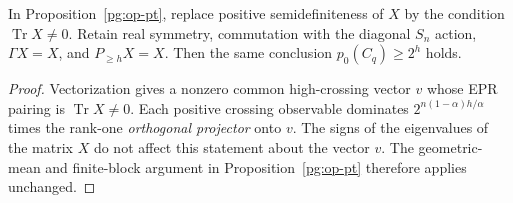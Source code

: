 \begin{lemma}
\label{pg:op-signed}
In Proposition~\ref{pg:op-pt}, replace positive semidefiniteness of $X$
by the condition $\operatorname{Tr}X\ne0$. Retain real symmetry,
commutation with the diagonal $S_n$ action, $\Gamma X=X$, and
$P_{\geq h}X=X$. Then the same conclusion $p_0(C_q)\geq2^h$ holds.
\end{lemma}
\begin{proof}
Vectorization gives a nonzero common high-crossing vector $v$ whose EPR
pairing is $\operatorname{Tr}X\ne0$. Each positive crossing observable
dominates $2^{n(1-\alpha)h/\alpha}$ times the rank-one \emph{orthogonal
projector} onto $v$. The signs of the eigenvalues of the matrix $X$ do
not affect this statement about the vector $v$. The geometric-mean and
finite-block argument in Proposition~\ref{pg:op-pt} therefore applies
unchanged.
\end{proof}

